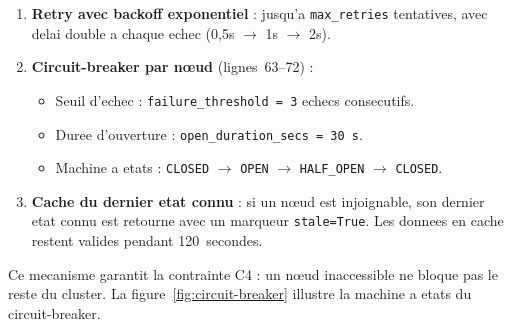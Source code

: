 \begin{enumerate}
    \item \textbf{Retry avec backoff exponentiel} : jusqu'a \texttt{max\_retries} tentatives, avec delai double a chaque echec (0,5s $\to$ 1s $\to$ 2s).

    \item \textbf{Circuit-breaker par nœud} (lignes~63--72) :
    \begin{itemize}
        \item Seuil d'echec : \texttt{failure\_threshold = 3} echecs consecutifs.
        \item Duree d'ouverture : \texttt{open\_duration\_secs = 30~s}.
        \item Machine a etats : \texttt{CLOSED} $\to$ \texttt{OPEN} $\to$ \texttt{HALF\_OPEN} $\to$ \texttt{CLOSED}.
    \end{itemize}

    \item \textbf{Cache du dernier etat connu} : si un nœud est injoignable, son dernier etat connu est retourne avec un marqueur \texttt{stale=True}. Les donnees en cache restent valides pendant 120~secondes.
\end{enumerate}

Ce mecanisme garantit la contrainte C4 : un nœud inaccessible ne bloque pas le reste du cluster. La figure~\ref{fig:circuit-breaker} illustre la machine a etats du circuit-breaker.

